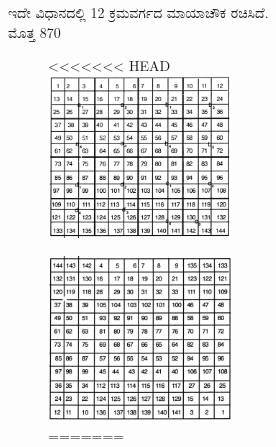\begin{figure}[H]
\begin{figure}[H]
\begin{figure}[h]
ಇದೇ ವಿಧಾನದಲ್ಲಿ 12 ಕ್ರಮವರ್ಗದ ಮಾಯಾಚೌಕ ರಚಿಸಿದೆ. ಮೊತ್ತ 870
\begin{figure}[H]
<<<<<<< HEAD
\includegraphics[scale=.9]{src/figures/chap3/fig3-28.jpg}
\end{figure}
\begin{figure}[H]
\includegraphics[scale=.9]{src/figures/chap3/fig3-29.jpg}
=======

\end{figure}
\end{figure}
\end{figure}
\end{figure}
